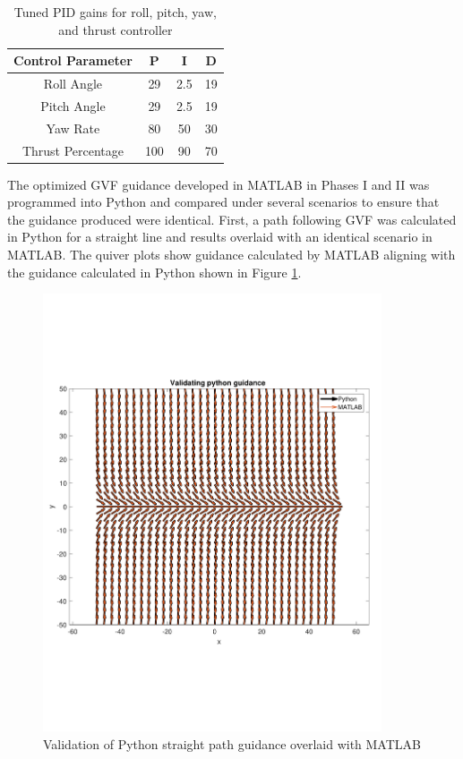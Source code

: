 \documentclass[numbered,pdftex]{ohio-etd}
\begin{document}
\begin{table}[H]
	\centering
	\caption{Tuned PID gains for roll, pitch, yaw, and thrust controller}
	\label{table:pidGains}
	\begin{tabular}{|c|c|c|c|}
		\hline 
		Control Parameter & P & I & D \\ 
		\hline 
		Roll Angle & 29 & 2.5 & 19 \\ 
		\hline 
		Pitch Angle & 29 & 2.5 & 19 \\ 
		\hline 
		Yaw Rate & 80 & 50 & 30 \\ 
		\hline 
		Thrust Percentage & 100 & 90 & 70 \\ 
		\hline 
	\end{tabular}
\end{table}
 

The optimized GVF guidance developed in MATLAB in Phases I and II was programmed into Python and compared under several scenarios to ensure that the guidance produced were identical. First, a path following GVF was calculated in Python for a straight line and results overlaid with an identical scenario in MATLAB. The quiver plots show guidance calculated by MATLAB aligning with the guidance calculated in Python shown in Figure \ref{fig:valPythonStraightPath}.

\begin{figure}[H]
	\centering
	\includegraphics[trim=0 150 0 150,clip,width=10cm]{PaperFigures/Methods/resultsPython/PathConfirm}
	\caption{Validation of Python straight path guidance overlaid with MATLAB}
	\label{fig:valPythonStraightPath}
\end{figure}
\end{document}
